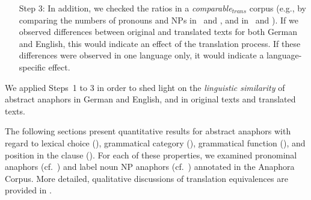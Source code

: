 \documentclass[output=paper]{LSP/langsci}
\begin{document}
\begin{enumerate}
\item[Step] 3: In addition, we checked the ratios in a \textit{comparable$_{trans}$} corpus (e.g., by comparing the numbers of pronouns and NPs in \DEo\  and \DEt,  and in \ENo\ and \ENt). If we observed differences between original and translated texts for both German and English, this would indicate  an effect of the translation process. If these differences were observed in one language only, it would indicate a language-specific effect.
\end{enumerate}

We applied Steps~1 to 3 in order to shed light on the \emph{linguistic similarity} of abstract anaphors in German and English, and in original texts and translated texts.

The following sections present quantitative results for abstract anaphors with regard to lexical choice (), grammatical category (), grammatical function (), and position in the clause (). For each of these properties, we examined pronominal anaphors (cf.\ ) and label noun NP anaphors (cf.\ ) annotated in the Anaphora Corpus. More detailed, qualitative discussions of translation equivalences are provided in .






\end{document}
